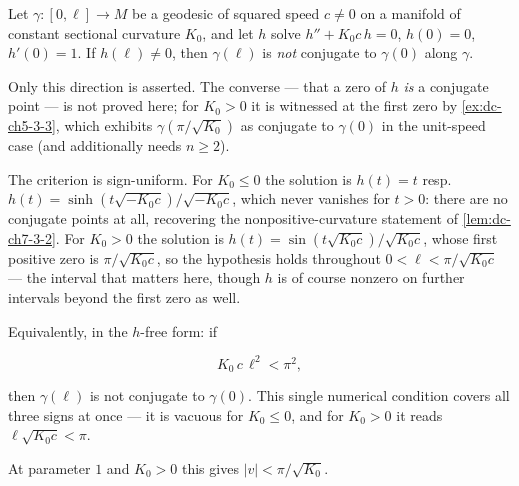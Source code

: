 \begin{lemma}
  \label{lem:dc-ch8-2-1-no-conjugate}
  \leanok
  Let $\gamma:[0,\ell]\to M$ be a geodesic of squared speed $c\neq0$ on a manifold of constant
  sectional curvature $K_0$, and let $h$ solve $h''+K_0c\,h=0$, $h(0)=0$, $h'(0)=1$. If
  $h(\ell)\neq0$, then $\gamma(\ell)$ is \emph{not} conjugate to $\gamma(0)$ along $\gamma$.

  Only this direction is asserted. The converse --- that a zero of $h$ \emph{is} a conjugate
  point --- is not proved here; for $K_0>0$ it is witnessed at the first zero by
  \cref{ex:dc-ch5-3-3}, which exhibits $\gamma(\pi/\sqrt{K_0})$ as conjugate to $\gamma(0)$ in
  the unit-speed case (and additionally needs $n\geq2$).

  The criterion is sign-uniform. For $K_0\leq0$ the solution is $h(t)=t$ resp.
  $h(t)=\sinh(t\sqrt{-K_0c})/\sqrt{-K_0c}$, which never vanishes for $t>0$: there are no
  conjugate points at all, recovering the nonpositive-curvature statement of
  \cref{lem:dc-ch7-3-2}. For $K_0>0$ the solution is $h(t)=\sin(t\sqrt{K_0c})/\sqrt{K_0c}$,
  whose first positive zero is $\pi/\sqrt{K_0c}$, so the hypothesis holds throughout
  $0<\ell<\pi/\sqrt{K_0c}$ --- the interval that matters here, though $h$ is of course nonzero
  on further intervals beyond the first zero as well.

  Equivalently, in the $h$-free form: if

  $$
  K_0\,c\,\ell^2 < \pi^2,
  $$

  then $\gamma(\ell)$ is not conjugate to $\gamma(0)$. This single numerical condition covers
  all three signs at once --- it is vacuous for $K_0\leq0$, and for $K_0>0$ it reads
  $\ell\sqrt{K_0c}<\pi$.

  At parameter $1$ and $K_0>0$ this gives $|v|<\pi/\sqrt{K_0}$.
\end{lemma}
